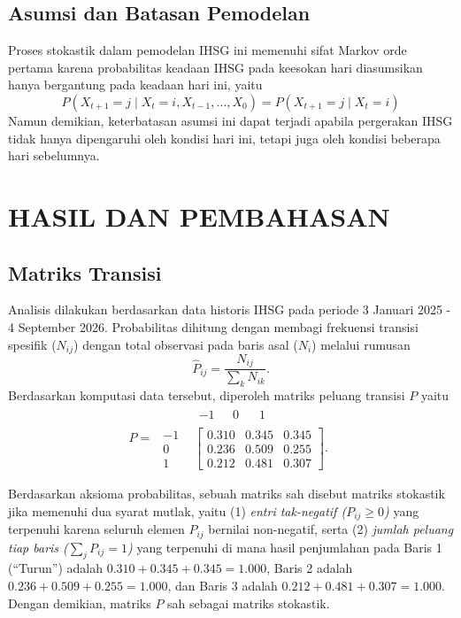 \documentclass[12pt,a4paper]{article}
\numberwithin{equation}{section}
\begin{document}
\subsection{Asumsi dan Batasan Pemodelan}
Proses stokastik dalam pemodelan IHSG ini memenuhi sifat Markov orde pertama karena probabilitas keadaan IHSG pada keesokan hari diasumsikan hanya bergantung pada keadaan hari ini, yaitu
    $$ P(X_{t+1} = j \mid X_t = i, X_{t-1}, \dots, X_0) = P(X_{t+1} = j \mid X_t = i) $$ 
Namun demikian, keterbatasan asumsi ini dapat terjadi apabila pergerakan IHSG tidak hanya dipengaruhi oleh kondisi hari ini, tetapi juga oleh kondisi beberapa hari sebelumnya.

\section{HASIL DAN PEMBAHASAN}

\subsection{Matriks Transisi}
Analisis dilakukan berdasarkan data historis IHSG pada periode 3 Januari 2025 - 4 September 2026. Probabilitas dihitung dengan membagi frekuensi transisi spesifik ($N_{ij}$) dengan total observasi pada baris asal ($N_i$) melalui rumusan
$$ \hat{P}_{ij} = \frac{N_{ij}}{\sum_{k} N_{ik}}. $$
Berdasarkan komputasi data tersebut, diperoleh matriks peluang transisi $P$ yaitu
$$
P = 
\begin{matrix}
& \begin{matrix} -1 & \,\,\,\, 0 & \,\,\,\,\, 1 \end{matrix} \\
\begin{matrix} -1 \\ 0 \\ 1 \end{matrix} &
\begin{bmatrix}
0.310 & 0.345 & 0.345 \\
0.236 & 0.509 & 0.255 \\
0.212 & 0.481 & 0.307
\end{bmatrix}.
\end{matrix}
$$

Berdasarkan aksioma probabilitas, sebuah matriks sah disebut matriks stokastik jika memenuhi dua syarat mutlak, yaitu (1) \textit{entri tak-negatif ($P_{ij} \ge 0$)} yang terpenuhi karena seluruh elemen $P_{ij}$ bernilai non-negatif, serta (2) \textit{jumlah peluang tiap baris ($\sum_{j} P_{ij} = 1$)} yang terpenuhi di mana hasil penjumlahan pada Baris 1 (``Turun'') adalah $0.310 + 0.345 + 0.345 = 1.000$, Baris 2 adalah $0.236 + 0.509 + 0.255 = 1.000$, dan Baris 3 adalah $0.212 + 0.481 + 0.307 = 1.000$. Dengan demikian, matriks $P$ sah sebagai matriks stokastik.
\end{document}
